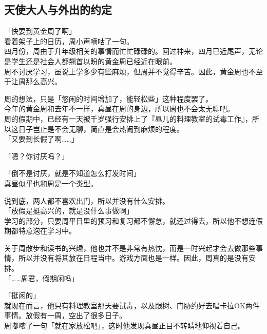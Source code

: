 \subsection{天使大人与外出的约定}

「快要到黄金周了啊」\\

看着架子上的日历，周小声嘀咕了一句。\\

四月份，周由于升年级相关的事情而忙忙碌碌的。回过神来，四月已近尾声，无论是学生还是社会人都翘首以盼的黄金周已经近在眼前。\\

周不讨厌学习，虽说上学多少有些麻烦，但周并不觉得辛苦。因此，黄金周也不至于让周那么高兴。

周的想法，只是「悠闲的时间增加了，能轻松些」这种程度罢了。\\

今年的黄金周和去年不一样，真昼在周的身边，所以周也不会太无聊吧。\\

周的假期中，已经有一天被千岁强行安排上了『昼儿的料理教室的试毒工作』，所以这日子岂止是不会无聊，简直是会热闹到麻烦的程度。\\

「又要到长假了啊……」

「嗯？你讨厌吗？」

「倒不是讨厌，就是不知道怎么打发时间」\\

真昼似乎也和周是一个类型。

说到底，两人都不喜欢出门，所以并没有什么安排。\\

「放假是挺高兴的，就是没什么事做啊」\\

学习的部分，只要周平日里的预习和复习都不懈怠，就还过得去，所以他不想连假期都特意泡在学习中。

关于周散步和读书的兴趣，他也并不是非常有热忱，而是一时兴起才会去做那些事情，所以并没有将其放在日程当中。游戏方面也是一样。因此，周真的是没有安排。\\

「……周君，假期闲吗」

「挺闲的」\\

就现在而言，他只有料理教室那天要试毒，以及跟树、门胁约好去唱卡拉OK两件事情。放假有一周，空出了很多日子。\\

周嘟哝了一句「就在家放松吧」，这时他发现真昼正目不转睛地仰视着自己。\\

